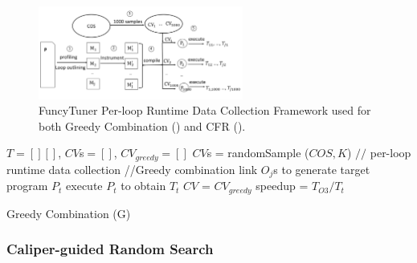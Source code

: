 \begin{figure}
\centering
\includegraphics[width=0.6\textwidth]{figures/framework}
\caption{FuncyTuner Per-loop Runtime Data Collection Framework used for
  both Greedy Combination () and CFR ().}
\label{fig:framework}
\end{figure}

\begin{algorithm}
\DontPrintSemicolon
\SetAlgoLined
{}
\BlankLine
$T = [][]$, $CV$s$ = []$, $CV_{greedy} = []$ \;
$CV$s = randomSample ($COS, K$)\;
$//$ \toolname per-loop runtime data collection\;
//Greedy combination\;
link $O_j$s to generate target program $P_t$\;
execute $P_t$ to obtain $T_t$\;
$CV$ = $CV_{greedy}$\;
speedup = $T_{O3}/T_t$ \;
\caption{Greedy Combination (G)}
\label{alg:greedy}
\end{algorithm}

\subsubsection{Caliper-guided Random Search}

